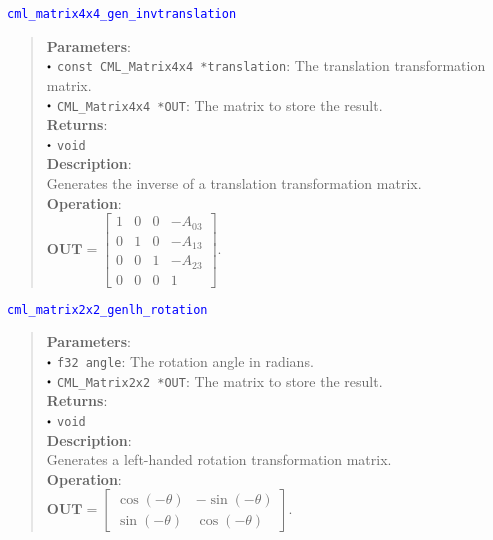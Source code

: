 \documentclass[a4paper,oneside,8pt]{extarticle}
\newcommand{\function}[1]{
  \noindent\textcolor{blue}{\texttt{#1}}
  \vspace{-0.3em}
}
\renewcommand{\dot}{\raisebox{0.3ex}{\scalebox{0.6}{$\bullet$}}}
\theoremstyle{definition}
\begin{document}
\function{cml\_matrix4x4\_gen\_invtranslation}
\begin{quote}
  \textbf{Parameters}: \\
  $\dot$ \texttt{const CML\_Matrix4x4 *translation}: The translation transformation matrix. \\
  $\dot$ \texttt{CML\_Matrix4x4 *OUT}: The matrix to store the result. \\
  \textbf{Returns}: \\
  $\dot$ \texttt{void} \\

  \vspace{-0.75em}
  \textbf{Description}: \\
  Generates the inverse of a translation transformation matrix. \\

  \vspace{-0.75em}
  \textbf{Operation}: \\
  $\mathbf{OUT} = \begin{bmatrix}
  1 & 0 & 0 & -A_{03} \\
  0 & 1 & 0 & -A_{13} \\
  0 & 0 & 1 & -A_{23} \\
  0 & 0 & 0 & 1
  \end{bmatrix}$. \\
\end{quote}

\function{cml\_matrix2x2\_genlh\_rotation}
\begin{quote}
  \textbf{Parameters}: \\
  $\dot$ \texttt{f32 angle}: The rotation angle in radians. \\
  $\dot$ \texttt{CML\_Matrix2x2 *OUT}: The matrix to store the result. \\
  \textbf{Returns}: \\
  $\dot$ \texttt{void} \\

  \vspace{-0.75em}
  \textbf{Description}: \\
  Generates a left-handed rotation transformation matrix. \\

  \vspace{-0.75em}
  \textbf{Operation}: \\
  $\mathbf{OUT} = \begin{bmatrix}
  \cos(-\theta) & -\sin(-\theta) \\
  \sin(-\theta) & \cos(-\theta)
  \end{bmatrix}$. \\
\end{quote}
\end{document}
